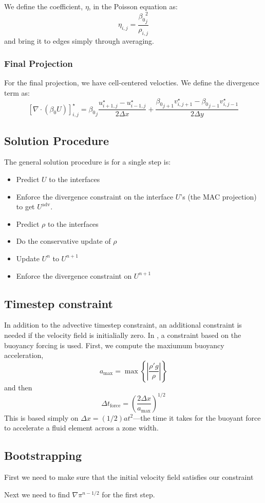 We define the coefficient, $\eta$, in the Poisson equation as:
\begin{equation}
\eta_{i,j} = \frac{{\beta_0}_j^2}{\rho_{i,j}}
\end{equation}
and bring it to edges simply through averaging.

\subsubsection{Final Projection}
  
For the final projection, we have cell-centered velocties.  We 
define the divergence term as:
\begin{equation}
\left [ \nabla \cdot (\beta_0 U) \right ]_{i,j}^\star =
   {\beta_0}_j \frac{u^\star_{i+1,j} - 
                     u^\star_{i-1,j}}{2\Delta x} +
   \frac{{\beta_0}_{j+1} v^\star_{i,j+1} - 
         {\beta_0}_{j-1} v^\star_{i,j-1} }{2\Delta y}
\end{equation}

\subsection{Solution Procedure}

The general solution procedure is for a single step is:
\begin{itemize}

\item Predict $U$ to the interfaces 
\item Enforce the divergence constraint on the interface $U$'s (the
  MAC projection) to get $U^\mathrm{adv}$.
\item Predict $\rho$ to the interfaces
\item Do the conservative update of $\rho$
\item Update $U^n$ to $U^{n+1}$
\item Enforce the divergence constraint on $U^{n+1}$

\end{itemize}


\subsection{Timestep constraint}

In addition to the advective timestep constraint, an additional constraint
is needed if the velocity field is initialially zero.  In \cite{ABNZ:III},
a constraint based on the buoyancy forcing is used.  First, we compute
the maxiumum buoyancy acceleration,
\begin{equation}
a_\mathrm{max} = \max \left \{ \left |\frac{\rho'g}{\rho} \right | \right \}
\end{equation}
and then 
\begin{equation}
\Delta t_\mathrm{force} = \left ( \frac{2 \Delta x}{a_\mathrm{max}} \right )^{1/2} 
\end{equation}
This is based simply on $\Delta x = (1/2) a t^2$---the
time it takes for the buoyant force to accelerate a fluid element
across a zone width.


\subsection{Bootstrapping}

First we need to make sure that the initial velocity field satisfies our constraint

Next we need to find $\nabla \pi^{n-1/2}$ for the first step.
